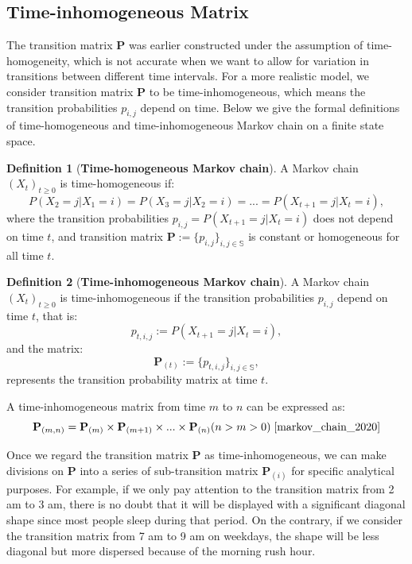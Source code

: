 \documentclass[12pt]{article}
\theoremstyle{definition}
\newtheorem{definition}{Definition}[section]
\begin{document}
\subsection{Time-inhomogeneous Matrix}
The transition matrix \textbf{P} was earlier constructed under the assumption of time-homogeneity, which is not accurate when we want to allow for variation in transitions between different time intervals. For a more realistic model, we consider transition matrix \textbf{P} to be time-inhomogeneous, which means the transition probabilities \(p_{i,j}\) depend on time. Below we give the formal definitions of time-homogeneous and time-inhomogeneous Markov chain on a finite state space.


\begin{definition}[\textbf{Time-homogeneous Markov chain}]
\label{def:time_homo_markov_chain}
A Markov chain \((X_{t})_{t \geq 0}\) is time-homogeneous if:
\begin{equation*}
P(X_{2}=j|X_{1}=i)=P(X_{3}=j|X_{2}=i)=...=P(X_{t+1}=j|X_{t}=i),
\end{equation*}
where the transition probabilities \(p_{i,j}=P(X_{t+1}=j|X_{t}=i) \) does not depend on time \(t\), and transition matrix \(\textbf{P}:=\{p_{i,j}\}_{i,j \in \mathbb{S}}\) is constant or homogeneous for all time \(t\).
\end{definition}



\begin{definition}[\textbf{Time-inhomogeneous Markov chain}]
\label{def:time_inhomo_markov_chain}
A Markov chain \((X_{t})_{t \geq 0}\)  is time-inhomogeneous if the transition probabilities \(p_{i,j}\) depend on time \(t\), that is:
\begin{equation*}
p_{t,i,j}:=P(X_{t+1}=j|X_{t}=i),
\end{equation*}
and the matrix:
\begin{equation*}
\textbf{P}_{(t)}:=\{p_{t,i,j}\}_{i,j \in \mathbb{S}}, 
\end{equation*}
represents the transition probability matrix at time \(t\).
\end{definition}

A time-inhomogeneous matrix from time \(m\) to \(n\) can be expressed as:
\begin{equation*}
    \textbf{P}_{(m,n)}=\textbf{P}_{(m)} \times \textbf{P}_{(m+1)} \times ... \times \textbf{P}_{(n)} (n>m>0) \; \cite{markov_chain_2020}
\end{equation*}

Once we regard the transition matrix \textbf{P} as time-inhomogeneous, we can make divisions on \textbf{P} into a series of sub-transition matrix \(\textbf{P}_{(i)}\) for specific analytical purposes. For example, if we only pay attention to the transition matrix from 2 am to 3 am, there is no doubt that it will be displayed with a significant diagonal shape since most people sleep during that period. On the contrary, if we consider the transition matrix from 7 am to 9 am on weekdays, the shape will be less diagonal but more dispersed because of the morning rush hour.
\end{document}
